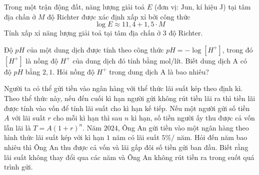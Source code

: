 \begin{bt}%
	Trong một  trận động đất, năng lượng giải toả $E$ (đơn vị: Jun, kí hiệu J) tại tâm địa chấn ở $M$ độ Richter được xác định xấp xỉ bởi công thức
	$$ 
	\log E \approx 11{,}4  + 1{,}5 \cdot M
	$$ 
	Tính xấp xỉ năng lượng giải toả tại tâm  địa chấn ở $3$ độ Richter.
\end{bt}

\begin{bt}%
	Độ $pH$ của một dung dịch được tính theo  công thức $pH=-\log\left[H^+ \right]$, trong đó $\left[H^+ \right]$ là nồng độ $H^+$ của dung dịch đó tính bằng mol/lít. Biết dung dịch A có độ $pH$ bằng $2{,}1$. Hỏi nồng độ $H^+$ trong dung dịch A là bao nhiêu?
\end{bt}

\begin{bt}%
	[1,0 điểm] Người ta có thể gửi tiền vào ngân hàng với thể thức lãi suất kép theo định kì. Theo thể thức này, nếu đến cuối kì hạn người gửi không  rút tiền lãi ra thì tiền lãi được tính vào vốn để tính lãi suất cho kì hạn kế tiếp.
	 Nếu một người gửi số tiền $A$ với lãi suất $r$ cho mỗi kì hạn thì sau $n$ kì hạn, số tiền người ấy thu được cả vốn lẫn lãi là $T=A(1+r)^n$.
	Năm $2024$, Ông An gửi tiền vào một ngân hàng theo hình thức lãi suất kép với kì hạn $1$ năm có lãi suất $5\%/$ năm. Hỏi đến năm bao nhiêu thì Ông An thu được cả vốn và lãi gấp đôi số tiền gửi ban đầu. Biết rằng lãi suất không thay đổi qua các năm và Ông An không rút tiền ra trong  suốt quá trình gửi.
\end{bt}

